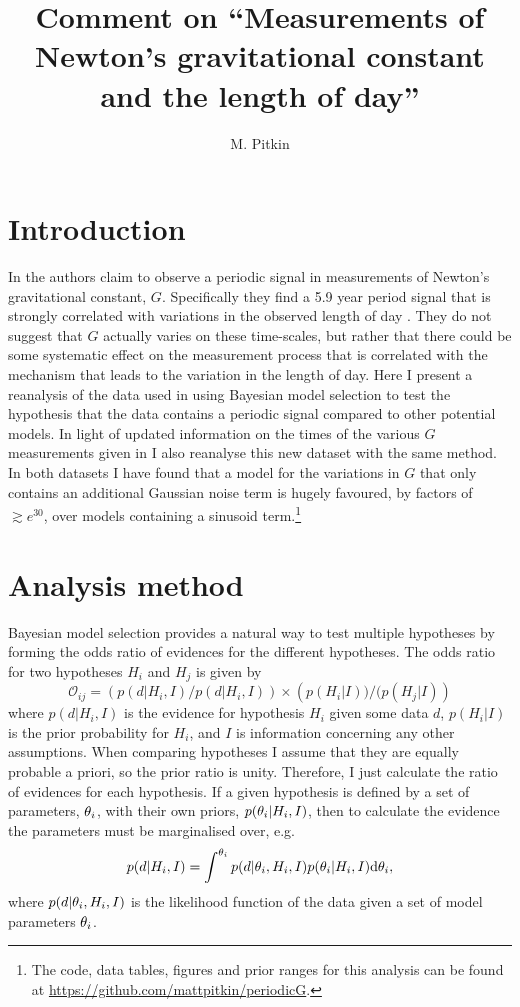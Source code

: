 \documentclass[comment]{epl2}
\title{Comment on ``Measurements of Newton's gravitational constant and the length of day''}
\author{M. Pitkin}
\institute{
  SUPA, School of Physics \& Astronomy, University of Glasgow, Glasgow, G12 8QQ, UK
}
\begin{document}
\maketitle

\section{Introduction}

In \cite{2015EL....11010002A} the authors claim to observe a periodic signal in measurements of
Newton's gravitational constant, $G$. Specifically they find a 5.9 year period signal that
is strongly correlated with variations in the observed length of day
\cite{2013Natur.499..202H}. They do not suggest that $G$ actually varies on these
time-scales, but rather that there could be some systematic effect on the measurement process that is
correlated with the mechanism that leads to the variation in the length of day.
Here I present a reanalysis of the data used in \cite{2015EL....11010002A}
using Bayesian model selection to test the hypothesis that the data contains
a periodic signal compared to other potential models. In light of updated information on the times
of the various $G$ measurements given in \cite{2015arXiv150501774S} I also reanalyse this new dataset with
the same method. In both datasets I have found that a model for the variations in $G$ that only contains an
additional Gaussian noise term is hugely favoured, by factors of $\gtrsim e^{30}$, over models containing
a sinusoid term.\footnote{The code, data tables, figures and prior ranges for this analysis can be
found at \url{https://github.com/mattpitkin/periodicG}.}

\section{Analysis method}

Bayesian model selection provides a natural way to test multiple hypotheses by forming the odds ratio of
evidences for the different hypotheses. The odds ratio for two hypotheses $H_i$ and $H_j$ is given by
\begin{equation}
 \mathcal{O}_{ij} = \left(p(d|H_i,I)/p(d|H_i,I)\right)\times\left(p(H_i|I))/(p(H_j|I)\right)
\end{equation}
where $p(d|H_i,I)$ is the evidence for hypothesis $H_i$ given some data $d$,
$p(H_i|I)$ is the prior probability for $H_i$, and $I$ is information concerning any other assumptions.
When comparing hypotheses I assume that they are equally
probable a priori, so the prior ratio is unity. Therefore, I just calculate
the ratio of evidences for each hypothesis. If a given hypothesis is defined
by a set of parameters, $\mathbf{\theta}_i$, with their own priors,
$p(\mathbf{\theta}_i|H_i,I)$, then to calculate the evidence the parameters must be marginalised
over, e.g.\
\begin{equation}\label{eq:evidence}
 p(d|H_i,I) = \int^{\mathbf{\theta}_i} p(d|\mathbf{\theta}_i,H_i,I) p(\mathbf{\theta}_i|H_i,I) {\rm d}\mathbf{\theta}_i,
\end{equation}
where $p(d|\mathbf{\theta}_i,H_i,I)$ is the likelihood function of the data given a set of model parameters $\mathbf{\theta}_i$.
\end{document}
